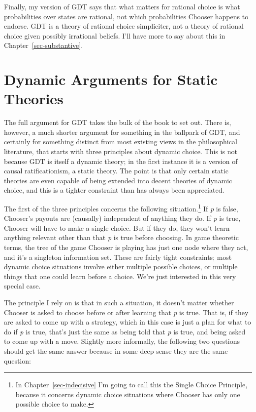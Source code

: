 \documentclass[
  12pt,
  letterpaper,
  DIV=11,
  numbers=noendperiod]{scrreprt}
\begin{document}
Finally, my version of GDT says that what matters for rational choice is
what probabilities over states are rational, not which probabilities
Chooser happens to endorse. GDT is a theory of rational choice
simpliciter, not a theory of rational choice given possibly irrational
beliefs. I'll have more to say about this in
Chapter~\ref{sec-substantive}.

\hypertarget{sec-dynamic-argue}{%
\section{Dynamic Arguments for Static
Theories}\label{sec-dynamic-argue}}

The full argument for GDT takes the bulk of the book to set out. There
is, however, a much shorter argument for something in the ballpark of
GDT, and certainly for something distinct from most existing views in
the philosophical literature, that starts with three principles about
dynamic choice. This is not because GDT is itself a dynamic theory; in
the first instance it is a version of causal ratificationism, a static
theory. The point is that only certain static theories are even capable
of being extended into decent theories of dynamic choice, and this is a
tighter constraint than has always been appreciated.

The first of the three principles concerns the following
situation.\footnote{In Chapter~\ref{sec-indecisive} I'm going to call
  this the Single Choice Principle, because it concerns dynamic choice
  situations where Chooser has only one possible choice to make.} If
\emph{p} is false, Chooser's payouts are (causally) independent of
anything they do. If \emph{p} is true, Chooser will have to make a
single choice. But if they do, they won't learn anything relevant other
than that \emph{p} is true before choosing. In game theoretic terms, the
tree of the game Chooser is playing has just one node where they act,
and it's a singleton information set. These are fairly tight
constraints; most dynamic choice situations involve either multiple
possible choices, or multiple things that one could learn before a
choice. We're just interested in this very special case.

The principle I rely on is that in such a situation, it doesn't matter
whether Chooser is asked to choose before or after learning that
\emph{p} is true. That is, if they are asked to come up with a strategy,
which in this case is just a plan for what to do if \emph{p} is true,
that's just the same as being told that \emph{p} is true, and being
asked to come up with a move. Slightly more informally, the following
two questions should get the same answer because in some deep sense they
are the same question:
\end{document}
